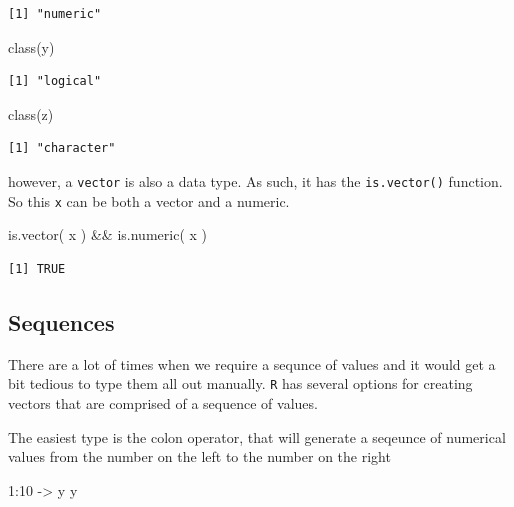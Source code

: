 \documentclass[
  letterpaper,
]{book}
\newenvironment{Shaded}{\begin{snugshade}}{\end{snugshade}}
\newcommand{\DecValTok}[1]{\textcolor[rgb]{0.68,0.00,0.00}{#1}}
\newcommand{\FunctionTok}[1]{\textcolor[rgb]{0.28,0.35,0.67}{#1}}
\newcommand{\NormalTok}[1]{\textcolor[rgb]{0.00,0.23,0.31}{#1}}
\newcommand{\OtherTok}[1]{\textcolor[rgb]{0.00,0.23,0.31}{#1}}
\newcommand{\SpecialCharTok}[1]{\textcolor[rgb]{0.37,0.37,0.37}{#1}}
\begin{document}
\begin{verbatim}
[1] "numeric"
\end{verbatim}

\begin{Shaded}
\begin{Highlighting}[]
\FunctionTok{class}\NormalTok{(y)}
\end{Highlighting}
\end{Shaded}

\begin{verbatim}
[1] "logical"
\end{verbatim}

\begin{Shaded}
\begin{Highlighting}[]
\FunctionTok{class}\NormalTok{(z)}
\end{Highlighting}
\end{Shaded}

\begin{verbatim}
[1] "character"
\end{verbatim}

however, a \texttt{vector} is also a data type. As such, it has the
\texttt{is.vector()} function. So this \texttt{x} can be both a vector
and a numeric.

\begin{Shaded}
\begin{Highlighting}[]
\FunctionTok{is.vector}\NormalTok{( x ) }\SpecialCharTok{\&\&} \FunctionTok{is.numeric}\NormalTok{( x )}
\end{Highlighting}
\end{Shaded}

\begin{verbatim}
[1] TRUE
\end{verbatim}

\subsection{Sequences}\label{sequences}

There are a lot of times when we require a sequnce of values and it
would get a bit tedious to type them all out manually. \texttt{R} has
several options for creating vectors that are comprised of a sequence of
values.

The easiest type is the colon operator, that will generate a seqeunce of
numerical values from the number on the left to the number on the right

\begin{Shaded}
\begin{Highlighting}[]
\DecValTok{1}\SpecialCharTok{:}\DecValTok{10} \OtherTok{{-}\textgreater{}}\NormalTok{ y}
\NormalTok{y}
\end{Highlighting}
\end{Shaded}
\end{document}
